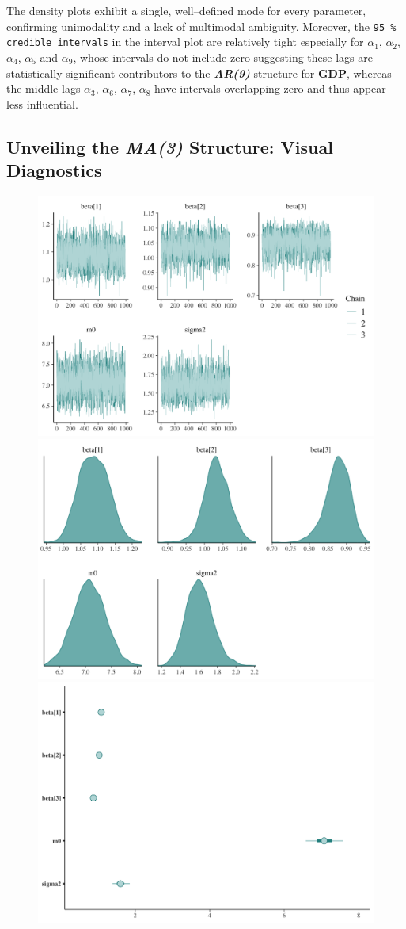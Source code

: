 \documentclass{Configuration_Files/PoliMi3i_thesis}
\begin{document}
The density plots exhibit a single, well–defined mode for every parameter, confirming unimodality and a lack of multimodal ambiguity. Moreover, the \texttt{95 \% credible intervals} in the interval plot are relatively tight especially for \(\alpha_1\), \(\alpha_2\), \(\alpha_4\), \(\alpha_5\) and \(\alpha_9\), whose intervals do not include zero suggesting these lags are statistically significant contributors to the \textbf{\textit{AR(9)}} structure for \textbf{GDP}, whereas the middle lags \(\alpha_3\), \(\alpha_6\), \(\alpha_7\), \(\alpha_8\) have intervals overlapping zero and thus appear less influential.
\newpage
\subsection{Unveiling the \textbf{\textit{MA(3)}} Structure: Visual Diagnostics}
\begin{figure}[H]
    \centering
    \includegraphics[width=0.62\linewidth]{MA(3)_trace.png}
    \vspace{0.5em}
    
    \includegraphics[width=0.62\linewidth]{MA(3)_density.png}
    \vspace{0.5em}
    
    \includegraphics[width=0.62\linewidth]{MA(3)_interval.png}
\end{figure}
\end{document}
